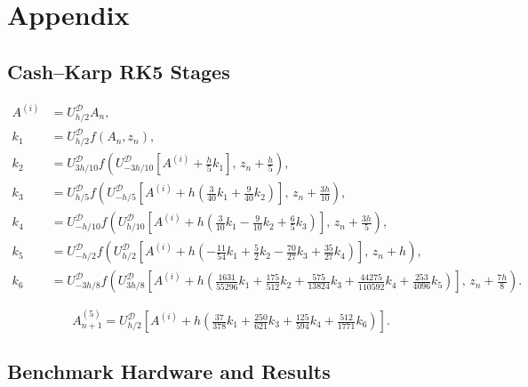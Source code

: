 \chapter{Appendix}

\section{Cash--Karp RK5 Stages}
\label{app:rk5}

\begin{equation}
  \label{eq:rk5-stages}
  \begin{aligned}
    A^{(i)} &= U_{h/2}^{\mathcal{D}} A_n, \\
    k_1 &= U_{h/2}^{\mathcal{D}} f(A_n, z_n), \\
    k_2 &= U_{3h/10}^{\mathcal{D}} f\!\left(U_{-3h/10}^{\mathcal{D}}\left[A^{(i)} + \tfrac{h}{5}k_1\right],\, z_n + \tfrac{h}{5}\right), \\
    k_3 &= U_{h/5}^{\mathcal{D}} f\!\left(U_{-h/5}^{\mathcal{D}}\left[A^{(i)} + h\left(\tfrac{3}{40}k_1 + \tfrac{9}{40}k_2\right)\right],\, z_n + \tfrac{3h}{10}\right), \\
    k_4 &= U_{-h/10}^{\mathcal{D}} f\!\left(U_{h/10}^{\mathcal{D}}\left[A^{(i)} + h\left(\tfrac{3}{10}k_1 - \tfrac{9}{10}k_2 + \tfrac{6}{5}k_3\right)\right],\, z_n + \tfrac{3h}{5}\right), \\
    k_5 &= U_{-h/2}^{\mathcal{D}} f\!\left(U_{h/2}^{\mathcal{D}}\left[A^{(i)} + h\left(-\tfrac{11}{54}k_1 + \tfrac{5}{2}k_2 - \tfrac{70}{27}k_3 + \tfrac{35}{27}k_4\right)\right],\, z_n + h\right), \\
    k_6 &= U_{-3h/8}^{\mathcal{D}} f\!\left(U_{3h/8}^{\mathcal{D}}\left[A^{(i)} + h\left(\tfrac{1631}{55296}k_1 + \tfrac{175}{512}k_2 + \tfrac{575}{13824}k_3 + \tfrac{44275}{110592}k_4 + \tfrac{253}{4096}k_5\right)\right],\, z_n + \tfrac{7h}{8}\right).
  \end{aligned}
\end{equation}

\begin{equation}
  \label{eq:rk5-solution}
  A_{n+1}^{(5)} = U_{h/2}^{\mathcal{D}}\left[A^{(i)} + h\left(\tfrac{37}{378}k_1 + \tfrac{250}{621}k_3 + \tfrac{125}{594}k_4 + \tfrac{512}{1771}k_6\right)\right].
\end{equation}

\section{Benchmark Hardware and Results}
\label{app:benchmarks}

